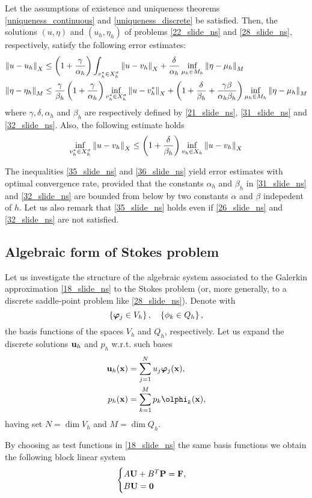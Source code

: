 \begin{theorem}
    Let the assumptions of existence and uniqueness theorems \eqref{uniqueness_continuous} and \eqref{uniqueness_discrete} be satisfied. Then, the solutions \((u,\eta)\) and \((u_h, \eta_h)\) of problems \eqref{22_slide_ns} and \eqref{28_slide_ns}, respectively, satisfy the following error estimates: 
    \begin{align}
        \norm{u-u_h}_X &\leq \left( 1+\frac{\gamma}{\alpha_h} \right)\int_{v_h^* \in X_h^\sigma} \norm{u-v_h}_X + \frac{\delta}{\alpha_h} \inf_{\mu_h \in M_h} \norm{\eta - \mu_h}_M \label{35_slide_ns} \\
            \norm{\eta - \eta_h}_M &\leq \frac{\gamma}{\beta_h} \left( 1+\frac{\gamma}{\alpha_h} \right) \inf_{v^*_h \in X_h^\sigma} \norm{u - v^*_h}_X + \left( 1 + \frac{\delta}{\beta_h} + \frac{\gamma \beta}{\alpha_h \beta_h} \right) \inf_{\mu_h \in M_h} \norm{\eta - \mu_h}_M \label{36_slide_ns}
    \end{align}
    where \(\gamma, \delta, \alpha_h\) and \(\beta_h\) are respectively defined by \eqref{21_slide_ns}, \eqref{31_slide_ns} and \eqref{32_slide_ns}. Also, the following estimate holds
    \begin{equation}
        \inf_{v^*_h \in X_h^\sigma} \norm{u - v_h}_X \leq \left( 1 + \frac{\delta}{\beta_h} \right) \inf_{v_h \in X_h} \norm{u - v_h}_X 
        \label{37_slide_ns}
    \end{equation}
\end{theorem}
The inequalities \eqref{35_slide_ns} and \eqref{36_slide_ns} yield error estimates with optimal convergence rate, provided that the constants \(\alpha_h\) and \(\beta_h\) in \eqref{31_slide_ns} and \eqref{32_slide_ns} are bounded from below by two constants \(\alpha\) and \(\beta\) indepedent of \(h\). Let us also remark that \eqref{35_slide_ns} holds even if \eqref{26_slide_ns} and \eqref{32_slide_ns} are not satisfied. 
\subsection*{Algebraic form of Stokes problem}
Let us investigate the structure of the algebraic system associated to the Galerkin approximation \eqref{18_slide_ns} to the Stokes problem (or, more generally, to a discrete saddle-point problem like \eqref{28_slide_ns}). Denote with 
\[
    \left\{ \bm{\phi}_j \in V_h \right\}, \quad \left\{ \oldphi_k \in Q_h \right\},
\]
the basis functions of the spaces \(V_h\) and \(Q_h\), respectively. Let us expand the discrete solutions \(\textbf{u}_h\) and \(p_h\) w.r.t. such bases 
\begin{equation}
    \begin{aligned}
        \uvec_h(\xvec) &= \sum_{j=1}^{N} u_j\bm{\phi}_j(\xvec), \\
        p_h(\xvec) &= \sum_{k=1}^{M} p_k\olphi_k(\xvec),
        \label{46_slide_ns}
    \end{aligned}
\end{equation}
having set \(N = \dim V_h\) and \(M = \dim Q_h\).

By choosing as test functions in \eqref{18_slide_ns} the same basis functions we obtain the following block linear system 
\begin{equation}
    \begin{cases}
        A\textbf{U} + B^T \textbf{P} = \textbf{F}, \\
        B\textbf{U} = \textbf{0}
    \end{cases}
    \label{47_slide_ns}
\end{equation}
